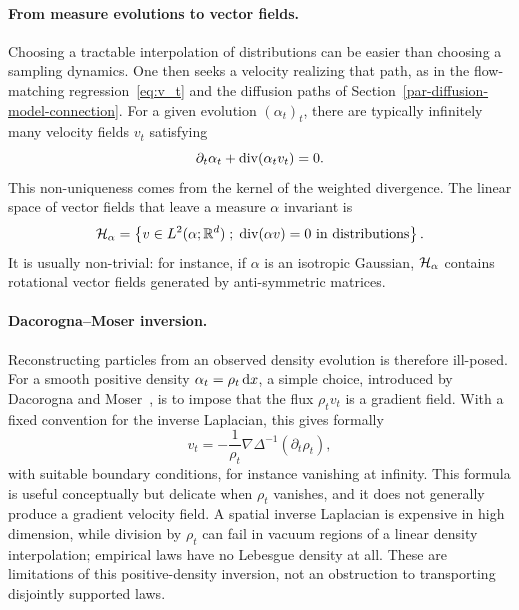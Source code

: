 \paragraph{From measure evolutions to vector fields.}

Choosing a tractable interpolation of distributions can be easier than choosing a sampling dynamics. One then seeks a velocity realizing that path, as in the flow-matching regression~\eqref{eq:v_t} and the diffusion paths of Section~\ref{par-diffusion-model-connection}. For a given evolution $(\alpha_t)_t$, there are typically infinitely many velocity fields $v_t$ satisfying
\begin{equation}\label{eq:inverse-flow}
	\partial_t\alpha_t+\operatorname{div}(\alpha_t v_t)=0.
\end{equation}
This non-uniqueness comes from the kernel of the weighted divergence. The linear space of vector fields that leave a measure $\alpha$ invariant is
\[
	\mathcal{H}_\alpha=\left\{ v\in L^2(\alpha;\mathbb{R}^d) \;;\; \operatorname{div}(\alpha v)=0\ \text{in distributions} \right\}.
\]
It is usually non-trivial: for instance, if $\alpha$ is an isotropic Gaussian, $\mathcal{H}_\alpha$ contains rotational vector fields generated by anti-symmetric matrices.

\paragraph{Dacorogna--Moser inversion.}

Reconstructing particles from an observed density evolution is therefore ill-posed. For a smooth positive density $\alpha_t=\rho_t\,\mathrm{d} x$, a simple choice, introduced by Dacorogna and Moser~\cite{DacorognaMoser1990}, is to impose that the flux $\rho_t v_t$ is a gradient field. With a fixed convention for the inverse Laplacian, this gives formally
\begin{equation}\label{eq:dacorogna-moser}
	v_t=-\frac{1}{\rho_t}\nabla\Delta^{-1}(\partial_t\rho_t),
\end{equation}
with suitable boundary conditions, for instance vanishing at infinity. This formula is useful conceptually but delicate when $\rho_t$ vanishes, and it does not generally produce a gradient velocity field. A spatial inverse Laplacian is expensive in high dimension, while division by $\rho_t$ can fail in vacuum regions of a linear density interpolation; empirical laws have no Lebesgue density at all. These are limitations of this positive-density inversion, not an obstruction to transporting disjointly supported laws.


